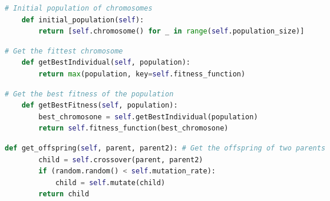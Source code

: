 \documentclass[12pt]{report} %
\begin{document}
\vspace{1cm}

\begin{changemargin}{-3cm}{-2cm}

	\begin{lstlisting}[language=python, caption= {Initial population}, captionpos=b]
    # Initial population of chromosomes
    def initial_population(self):
        return [self.chromosome() for _ in range(self.population_size)]
\end{lstlisting}
\end{changemargin}


\vspace{1cm}

\begin{changemargin}{-3cm}{-2cm}

	\begin{lstlisting}[language=python, caption= {Fittest chromosome}, captionpos=b]
    # Get the fittest chromosome
    def getBestIndividual(self, population):
        return max(population, key=self.fitness_function)
\end{lstlisting}
\end{changemargin}


\vspace{1cm}

\begin{changemargin}{-3cm}{-2cm}

	\begin{lstlisting}[language=python, caption= {Best fitness}, captionpos=b]
    # Get the best fitness of the population
    def getBestFitness(self, population):
        best_chromosone = self.getBestIndividual(population)
        return self.fitness_function(best_chromosone)
\end{lstlisting}
\end{changemargin}


\newpage

\begin{changemargin}{-3cm}{-2cm}

	\begin{lstlisting}[language=python, caption= { Every offspring has a chance of being mutated}, captionpos=b]
    def get_offspring(self, parent, parent2): # Get the offspring of two parents
        child = self.crossover(parent, parent2)
        if (random.random() < self.mutation_rate):
            child = self.mutate(child)
        return child
\end{lstlisting}
\end{changemargin}
\end{document}
